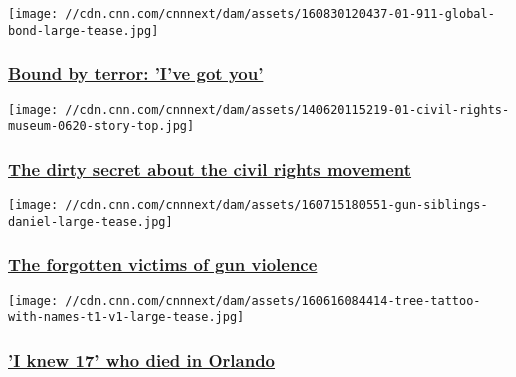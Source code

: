 \href{/2016/09/06/world/terrorism-camp-friendship/index.html}{}

\texttt{[image: //cdn.cnn.com/cnnnext/dam/assets/160830120437-01-911-global-bond-large-tease.jpg]}

\hypertarget{bound-by-terror-ive-got-you}{%
\subsubsection{\texorpdfstring{\href{/2016/09/06/world/terrorism-camp-friendship/index.html}{Bound
by terror: 'I've got
you'}}{Bound by terror: 'I've got you'}}\label{bound-by-terror-ive-got-you}}

\href{/2014/06/21/living/movement-dull/index.html}{}

\texttt{[image: //cdn.cnn.com/cnnnext/dam/assets/140620115219-01-civil-rights-museum-0620-story-top.jpg]}

\hypertarget{the-dirty-secret-about-the-civil-rights-movement}{%
\subsubsection{\texorpdfstring{\href{/2014/06/21/living/movement-dull/index.html}{The
dirty secret about the civil rights
movement}}{The dirty secret about the civil rights movement}}\label{the-dirty-secret-about-the-civil-rights-movement}}

\href{/2016/08/12/health/gun-violence-forgotten-victims/index.html}{}

\texttt{[image: //cdn.cnn.com/cnnnext/dam/assets/160715180551-gun-siblings-daniel-large-tease.jpg]}

\hypertarget{the-forgotten-victims-of-gun-violence}{%
\subsubsection{\texorpdfstring{\href{/2016/08/12/health/gun-violence-forgotten-victims/index.html}{The
forgotten victims of gun
violence}}{The forgotten victims of gun violence}}\label{the-forgotten-victims-of-gun-violence}}

\href{/2016/06/16/opinions/sutter-orlando-shooting-tree/index.html}{}

\texttt{[image: //cdn.cnn.com/cnnnext/dam/assets/160616084414-tree-tattoo-with-names-t1-v1-large-tease.jpg]}

\hypertarget{i-knew-17-who-died-in-orlando}{%
\subsubsection{\texorpdfstring{\href{/2016/06/16/opinions/sutter-orlando-shooting-tree/index.html}{'I
knew 17' who died in
Orlando}}{'I knew 17' who died in Orlando}}\label{i-knew-17-who-died-in-orlando}}

